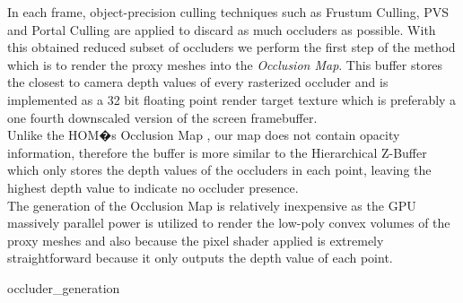 \documentclass[10pt, conference]{IEEEtran}
\begin{document}
In each frame, object-precision culling techniques such as Frustum Culling, PVS and Portal Culling \cite{survey_visibility} are applied 
to discard as much occluders as possible. 
With this obtained reduced subset of occluders we perform the first step of the method which is to render the proxy meshes into the \emph{Occlusion Map}. 
This buffer stores the closest to camera depth values of every rasterized occluder and is implemented as a 32 bit floating point render target texture 
which is preferably a one fourth downscaled version of the screen framebuffer. \\

Unlike the HOM�s Occlusion Map \cite{hom}, our map does not contain opacity information, therefore the buffer is more similar 
to the Hierarchical Z-Buffer \cite{Hierarchical_zbuffer} which only stores the depth values of the occluders in 
each point, leaving the highest depth value to indicate no occluder presence.\\

The generation of the Occlusion Map is relatively inexpensive as the GPU massively parallel power is utilized to render the low-poly convex volumes of 
the proxy meshes and also because the pixel shader applied is extremely straightforward because it only outputs the depth value of each point.

{occluder_generation}{
%
}


\end{document}
